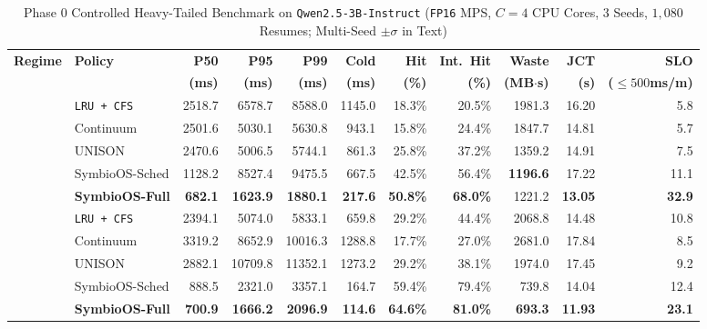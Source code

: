 \documentclass[10pt,journal,compsoc]{IEEEtran}
\theoremstyle{definition}
\theoremstyle{remark}
\newcommand{\SymbioSched}{\textup{\textsc{SymbioOS-Sched}}}
\newcommand{\SymbioFull}{\textup{\textsc{SymbioOS-Full}}}
\newcommand{\Continuum}{\textup{\textsc{Continuum}}}
\newcommand{\UNISON}{\textup{\textsc{UNISON}}}
\def\SymbioSched{SymbioOS-Sched}%
\def\SymbioFull{SymbioOS-Full}%
\def\Continuum{Continuum}%
\def\UNISON{UNISON}%
\begin{document}
\begin{table}[!t]
\centering
\caption{Phase 0 Controlled Heavy-Tailed Benchmark on \texttt{Qwen2.5-3B-Instruct} (\texttt{FP16} MPS, $C = 4$ CPU Cores, $3$ Seeds, $1{,}080$ Resumes; Multi-Seed $\pm\sigma$ in Text)}
\label{tab:phase0}
\scriptsize
\setlength{\tabcolsep}{2.6pt}
\begin{tabular}{llrrrrrrrrr}
\toprule
\textbf{Regime} & \textbf{Policy} & \textbf{P50} & \textbf{P95} & \textbf{P99} & \textbf{Cold} & \textbf{Hit} & \textbf{Int.\ Hit} & \textbf{Waste} & \textbf{JCT} & \textbf{SLO} \\
 & & \textbf{(ms)} & \textbf{(ms)} & \textbf{(ms)} & \textbf{(ms)} & \textbf{(\%)} & \textbf{(\%)} & \textbf{(MB$\cdot$s)} & \textbf{(s)} & \textbf{($\le 500$ms/m)} \\
\midrule
{}
 & \texttt{LRU + CFS} & 2518.7 & 6578.7 & 8588.0 & 1145.0 & 18.3\% & 20.5\% & 1981.3 & 16.20 & 5.8 \\
 & \Continuum{} & 2501.6 & 5030.1 & 5630.8 & 943.1 & 15.8\% & 24.4\% & 1847.7 & 14.81 & 5.7 \\
 & \UNISON{} & 2470.6 & 5006.5 & 5744.1 & 861.3 & 25.8\% & 37.2\% & 1359.2 & 14.91 & 7.5 \\
 & \SymbioSched{} & 1128.2 & 8527.4 & 9475.5 & 667.5 & 42.5\% & 56.4\% & \textbf{1196.6} & 17.22 & 11.1 \\
 & \textbf{\SymbioFull{}} & \textbf{682.1} & \textbf{1623.9} & \textbf{1880.1} & \textbf{217.6} & \textbf{50.8\%} & \textbf{68.0\%} & 1221.2 & \textbf{13.05} & \textbf{32.9} \\
\midrule
{}
 & \texttt{LRU + CFS} & 2394.1 & 5074.0 & 5833.1 & 659.8 & 29.2\% & 44.4\% & 2068.8 & 14.48 & 10.8 \\
 & \Continuum{} & 3319.2 & 8652.9 & 10016.3 & 1288.8 & 17.7\% & 27.0\% & 2681.0 & 17.84 & 8.5 \\
 & \UNISON{} & 2882.1 & 10709.8 & 11352.1 & 1273.2 & 29.2\% & 38.1\% & 1974.0 & 17.45 & 9.2 \\
 & \SymbioSched{} & 888.5 & 2321.0 & 3357.1 & 164.7 & 59.4\% & 79.4\% & 739.8 & 14.04 & 12.4 \\
 & \textbf{\SymbioFull{}} & \textbf{700.9} & \textbf{1666.2} & \textbf{2096.9} & \textbf{114.6} & \textbf{64.6\%} & \textbf{81.0\%} & \textbf{693.3} & \textbf{11.93} & \textbf{23.1} \\
\bottomrule
\end{tabular}
\end{table}
\end{document}
